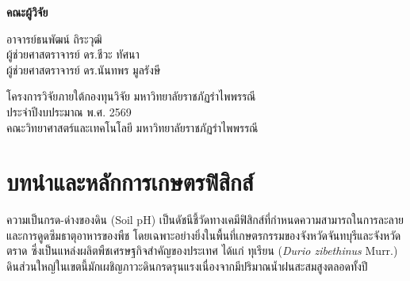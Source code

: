 \documentclass[12pt,a4paper,oneside]{report}
\begin{document}
\begin{titlepage}
\begin{tcolorbox}[
    enhanced,
    colback=white,
    colframe=rbruNavy,
    boxrule=2pt,
    arc=0mm,
    height=\textheight,
    interior style={left color=white, right color=rbruCodeBg}
]
\vfill

{\fontsize{14}{17}\selectfont\textbf{คณะผู้วิจัย}}\par\vspace{2mm}
{\fontsize{13}{16}\selectfont
อาจารย์ธนพัฒน์ ถิระวุฒิ\\
ผู้ช่วยศาสตราจารย์ ดร.ชีวะ ทัศนา\\
ผู้ช่วยศาสตราจารย์ ดร.นันทพร มูลรังษี
}\par\vspace{6mm}

{\fontsize{12}{15}\selectfont
โครงการวิจัยภายใต้กองทุนวิจัย มหาวิทยาลัยราชภัฏรำไพพรรณี\\
ประจำปีงบประมาณ พ.ศ. 2569\\
คณะวิทยาศาสตร์และเทคโนโลยี มหาวิทยาลัยราชภัฏรำไพพรรณี
}
\vspace*{0.6cm}
\end{tcolorbox}
\end{titlepage}

\chapter{บทนำและหลักการเกษตรฟิสิกส์}

ความเป็นกรด-ด่างของดิน (Soil pH) เป็นดัชนีชี้วัดทางเคมีฟิสิกส์ที่กำหนดความสามารถในการละลายและการดูดซึมธาตุอาหารของพืช โดยเฉพาะอย่างยิ่งในพื้นที่เกษตรกรรมของจังหวัดจันทบุรีและจังหวัดตราด ซึ่งเป็นแหล่งผลิตพืชเศรษฐกิจสำคัญของประเทศ ได้แก่ ทุเรียน (\textit{Durio zibethinus} Murr.) ดินส่วนใหญ่ในเขตนี้มักเผชิญภาวะดินกรดรุนแรงเนื่องจากมีปริมาณน้ำฝนสะสมสูงตลอดทั้งปี
\end{document}

